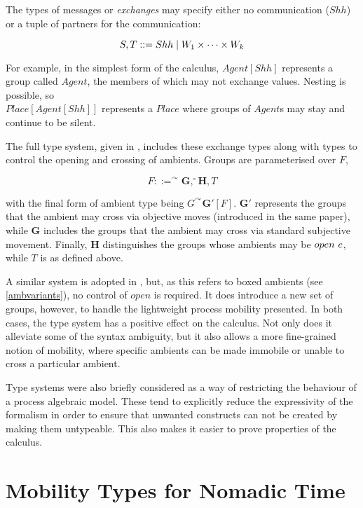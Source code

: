 The types of messages or \emph{exchanges} may specify either no
communication ($Shh$) or a tuple of partners for the communication:

\begin{equation}
S, T ::= Shh \;|\; W_1 \times \dots \times W_k
\end{equation}

\noindent For example, in the simplest form of the calculus,
$Agent[Shh]$ represents a group called $Agent$, the members of which
may not exchange values.  Nesting is possible, so \\$Place[Agent[Shh]]$
represents a $Place$ where groups of $Agent$s may stay and continue to
be silent.

The full type system, given in \cite{ambienttypes}, includes these
exchange types along with types to control the opening and crossing of
ambients.  Groups are parameterised over $F$,

\begin{equation}
F ::= ^\curvearrowright \mathbf{G}, ^\circ \mathbf{H}, T
\end{equation}

\noindent with the final form of ambient type being $G^\curvearrowright
\mathbf{G'}[F]$.  $\mathbf{G'}$ represents the groups that the ambient
may cross via objective moves (introduced in the same paper), while
$\mathbf{G}$ includes the groups that the ambient may cross via standard
subjective movement.  Finally, $\mathbf{H}$ distinguishes the groups
whose ambients may be $open\ e$, while $T$ is as defined above.

A similar system is adopted in \cite{m3}, but, as this refers to boxed
ambients (see \ref{ambvariants}), no control of $open$ is required.  It
does introduce a new set of groups, however, to handle the lightweight
process mobility presented.  In both cases, the type system has a
positive effect on the calculus.  Not only does it alleviate some of
the syntax ambiguity, but it also allows a more fine-grained notion of
mobility, where specific ambients can be made immobile or unable to
cross a particular ambient.

Type systems were also briefly considered as a way of restricting the
behaviour of a process algebraic model.  These tend to explicitly reduce
the expressivity of the formalism in order to ensure that unwanted
constructs can not be created by making them untypeable.  This also
makes it easier to prove properties of the calculus.  

\section{Mobility Types for Nomadic Time}
\label{typesys}

